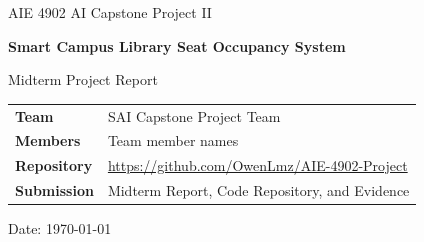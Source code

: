\documentclass[11pt,a4paper]{article}
\newcommand{\projecttitle}{Smart Campus Library Seat Occupancy System}
\newcommand{\coursename}{AIE 4902 AI Capstone Project II}
\newcommand{\reporttype}{Midterm Project Report}
\newcommand{\repositorylink}{\url{https://github.com/OwenLmz/AIE-4902-Project}}
\begin{document}
\begin{titlepage}
  \centering
  \vspace*{1.2cm}
  {\Large \coursename\par}
  \vspace{1.2cm}
  {\huge \textbf{\projecttitle}\par}
  \vspace{0.5cm}
  {\Large \reporttype\par}
  \vspace{1.5cm}
  \begin{tabular}{>{\bfseries}p{4cm}p{9cm}}
    Team & SAI Capstone Project Team \\
    Members & Team member names \\
    Repository & \repositorylink \\
    Submission & Midterm Report, Code Repository, and Evidence \\
  \end{tabular}
  \vfill
  {\large Date: \today\par}
\end{titlepage}

\tableofcontents
\newpage
{}











\appendix

\end{document}
